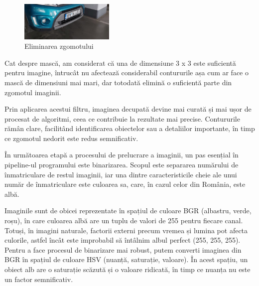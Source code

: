 \documentclass[a4paper,12pt]{report}
\begin{document}
\begin{figure}[h!]
    \centering
    \includegraphics[width=0.4\textwidth]{images/gauss.jpg}
    \caption{Eliminarea zgomotului}
\end{figure}
\FloatBarrier

Cat despre mască, am considerat că una de dimensiune 3 x 3 este suficientă pentru imagine, întrucât nu afectează considerabil contururile așa cum ar face o mască de dimensiuni mai mari, dar totodată elimină o suficientă parte din zgomotul imaginii.

Prin aplicarea acestui filtru, imaginea decupată devine mai curată și mai ușor de procesat de algoritmi, ceea ce contribuie la rezultate mai precise. Contururile rămân clare, facilitând identificarea obiectelor sau a detaliilor importante, în timp ce zgomotul nedorit este redus semnificativ.

În următoarea etapă a procesului de prelucrare a imaginii, un pas esențial în pipeline-ul programului este binarizarea. Scopul este separarea numărului de înmatriculare de restul imaginii, iar una dintre caracteristicile cheie ale unui număr de înmatriculare este culoarea sa, care, în cazul celor din România, este albă.

Imaginile sunt de obicei reprezentate în spațiul de culoare BGR (albastru, verde, roșu), în care culoarea albă are un tuplu de valori de 255 pentru fiecare canal. Totuși, în imagini naturale, factorii externi precum vremea și lumina pot afecta culorile, astfel încât este improbabil să întâlnim albul perfect (255, 255, 255). Pentru a face procesul de binarizare mai robust, putem converti imaginea din BGR în spațiul de culoare HSV (nuanță, saturație, valoare). În acest spațiu, un obiect alb are o saturație scăzută și o valoare ridicată, în timp ce nuanța nu este un factor semnificativ.
\end{document}
